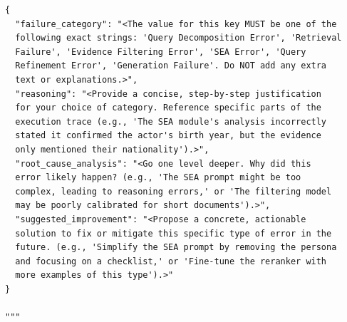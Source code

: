 \documentclass[11pt]{article}
\begin{document}
\begin{lstlisting}[basicstyle=\tiny\ttfamily]
{
  "failure_category": "<The value for this key MUST be one of the 
  following exact strings: 'Query Decomposition Error', 'Retrieval 
  Failure', 'Evidence Filtering Error', 'SEA Error', 'Query 
  Refinement Error', 'Generation Failure'. Do NOT add any extra 
  text or explanations.>",
  "reasoning": "<Provide a concise, step-by-step justification 
  for your choice of category. Reference specific parts of the 
  execution trace (e.g., 'The SEA module's analysis incorrectly 
  stated it confirmed the actor's birth year, but the evidence 
  only mentioned their nationality').>",
  "root_cause_analysis": "<Go one level deeper. Why did this 
  error likely happen? (e.g., 'The SEA prompt might be too 
  complex, leading to reasoning errors,' or 'The filtering model 
  may be poorly calibrated for short documents').>",
  "suggested_improvement": "<Propose a concrete, actionable 
  solution to fix or mitigate this specific type of error in the 
  future. (e.g., 'Simplify the SEA prompt by removing the persona 
  and focusing on a checklist,' or 'Fine-tune the reranker with 
  more examples of this type').>"
}

"""
\end{lstlisting}
\end{document}
